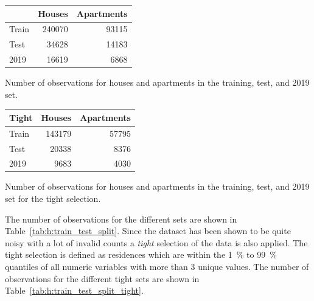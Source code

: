 \begin{margintable}[-8.5cm]
  \begin{tabular}{lrr}
              & Houses       & Apartments   \\ \midrule
   Train      & \num{240070} & \num{93115}  \\   
   Test       & \num{34628}  & \num{14183}  \\   
   \num{2019} & \num{16619}  & \num{6868} 
  \end{tabular}
  \vspace{1.5mm}
  \caption[Number of Observations in the Housing Dataset]{\label{tab:h:train_test_split}Number of observations for houses and apartments in the training, test, and \num{2019} set.}
  \vspace{3mm}
\end{margintable}

\begin{margintable}[-3cm]
  \begin{tabular}{lrr}
   Tight      & Houses        & Apartments  \\ \midrule
   Train      & \num{143179}  & \num{57795} \\   
   Test       & \num{20338}   & \num{8376}  \\   
   \num{2019} & \num{9683}    & \num{4030} 
  \end{tabular}
  \vspace{1.5mm}
  \caption[Number of Observations in the Housing Dataset for the Tight Selection]{\label{tab:h:train_test_split_tight}Number of observations for houses and apartments in the training, test, and \num{2019} set for the tight selection.}
  \vspace{3mm}
\end{margintable}

The number of observations for the different sets are shown in Table~\ref{tab:h:train_test_split}. Since the dataset has been shown to be quite noisy with a lot of invalid counts a \emph{tight} selection of the data is also applied. The tight selection is defined as residences which are within the \SI{1}{\percent} to \SI{99}{\percent} quantiles of all numeric variables with more than 3 unique values. The number of observations for the different tight sets are shown in Table~\ref{tab:h:train_test_split_tight}. 

